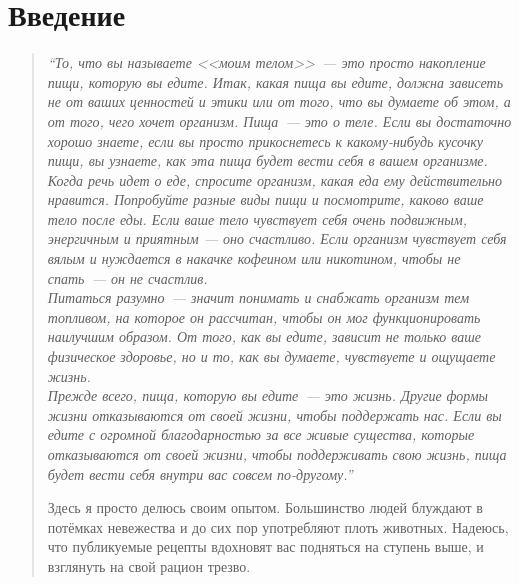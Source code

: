 \section{Введение}


\begin{quote}
\textit{``То, что вы называете <<моим телом>>~--- это просто накопление пищи, которую вы едите. Итак, какая пища вы едите, должна зависеть не от ваших ценностей и этики или от того, что вы думаете об этом, а от того, чего хочет организм. Пища~--- это о теле. Если вы достаточно хорошо знаете, если вы просто прикоснетесь к какому-нибудь кусочку пищи, вы узнаете, как эта пища будет вести себя в вашем организме.
\\[3pt]
Когда речь идет о еде, спросите организм, какая еда ему действительно нравится. Попробуйте разные виды пищи и посмотрите, каково ваше тело после еды. Если ваше тело чувствует себя очень подвижным, энергичным и приятным --- оно счастливо. Если организм чувствует себя вялым и нуждается в накачке кофеином или никотином, чтобы не спать~--- он не счастлив.
\\[3pt]
Питаться разумно~--- значит понимать и снабжать организм тем топливом, на которое он рассчитан, чтобы он мог функционировать наилучшим образом. От того, как вы едите, зависит не только ваше физическое здоровье, но и то, как вы думаете, чувствуете и ощущаете жизнь.
\\[3pt]
Прежде всего, пища, которую вы едите~--- это жизнь. Другие формы жизни отказываются от своей жизни, чтобы поддержать нас. Если вы едите с огромной благодарностью за все живые существа, которые отказываются от своей жизни, чтобы поддерживать свою жизнь, пища будет вести себя внутри вас совсем по-другому.''
\\[5pt]
}

Здесь я просто делюсь своим опытом. Большинство людей блуждают в потёмках невежества и до сих пор употребляют плоть животных. Надеюсь, что публикуемые рецепты вдохновят вас подняться на ступень выше, и взглянуть на свой рацион трезво.
\end{quote}
